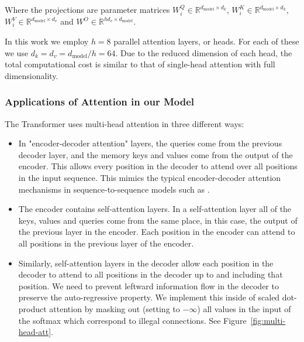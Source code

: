 \documentclass{article}
\newcommand{\dmodel}{d_{\text{model}}}
\begin{document}
Where the projections are parameter matrices $W^Q_i \in \mathbb{R}^{\dmodel \times d_k}$, $W^K_i \in \mathbb{R}^{\dmodel \times d_k}$, $W^V_i \in \mathbb{R}^{\dmodel \times d_v}$ and $W^O \in \mathbb{R}^{hd_v \times \dmodel}$.



In this work we employ $h=8$ parallel attention layers, or heads. For each of these we use $d_k=d_v=\dmodel/h=64$.
Due to the reduced dimension of each head, the total computational cost is similar to that of single-head attention with full dimensionality.

\subsubsection{Applications of Attention in our Model}

The Transformer uses multi-head attention in three different ways: 
\begin{itemize}
 \item In "encoder-decoder attention" layers, the queries come from the previous decoder layer, and the memory keys and values come from the output of the encoder.   This allows every position in the decoder to attend over all positions in the input sequence.  This mimics the typical encoder-decoder attention mechanisms in sequence-to-sequence models such as \citep{wu2016google, bahdanau2014neural,JonasFaceNet2017}.

 \item The encoder contains self-attention layers.  In a self-attention layer all of the keys, values and queries come from the same place, in this case, the output of the previous layer in the encoder.   Each position in the encoder can attend to all positions in the previous layer of the encoder.

 \item Similarly, self-attention layers in the decoder allow each position in the decoder to attend to all positions in the decoder up to and including that position.  We need to prevent leftward information flow in the decoder to preserve the auto-regressive property.  We implement this inside of scaled dot-product attention by masking out (setting to $-\infty$) all values in the input of the softmax which correspond to illegal connections.  See Figure~\ref{fig:multi-head-att}.

\end{itemize}
\end{document}

